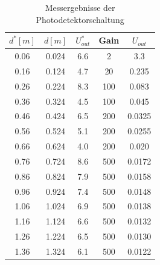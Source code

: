 \documentclass[11pt]{article}
\begin{document}
\begin{table}[h!]
\centering
\begin{tabular}{|c|c|c|c|c|}
\hline
$d^* [m]$ & $d [m]$ & $U_{out}^*$ & Gain & $U_{out}$ \\
\hline
0.06 & 0.024 & 6.6 & 2 & 3.3\\
0.16 & 0.124 & 4.7 & 20 & 0.235\\
0.26 & 0.224 & 8.3 & 100 & 0.083\\
0.36 & 0.324 & 4.5 & 100 & 0.045\\
0.46 & 0.424 & 6.5 & 200 & 0.0325\\
0.56 & 0.524 & 5.1 & 200 & 0.0255\\
0.66 & 0.624 & 4.0 & 200 & 0.020\\
0.76 & 0.724 & 8.6 & 500 & 0.0172\\
0.86 & 0.824 & 7.9 & 500 & 0.0158\\
0.96 & 0.924 & 7.4 & 500 & 0.0148\\
1.06 & 1.024 & 6.9 & 500 & 0.0138\\
1.16 & 1.124 & 6.6 & 500 & 0.0132\\
1.26 & 1.224 & 6.5 & 500 & 0.0130\\
1.36 & 1.324 & 6.1 & 500 & 0.0122\\
\hline
\end{tabular}
\label{data}
\caption{Messergebnisse der Photodetektorschaltung}
\end{table}
\end{document}
